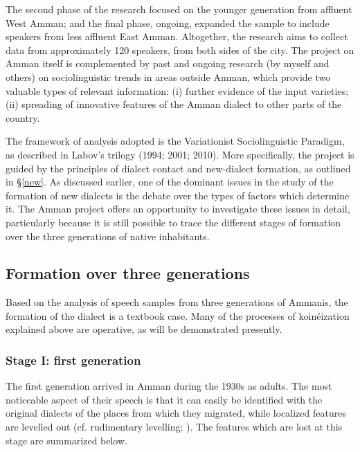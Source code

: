 \documentclass[output=paper]{langsci/langscibook}
\begin{document}
The second phase of the research focused on the younger generation from affluent West Amman; and the final phase, ongoing, expanded the sample to include speakers from less affluent East Amman. Altogether, the research aims to collect data from approximately 120 speakers, from both sides of the city. The project on Amman itself is complemented by past and ongoing research (by myself and others) on sociolinguistic trends in areas outside Amman, which provide two valuable types of relevant information: (i) further evidence of the input varieties; (ii) spreading of innovative features of the Amman dialect to other parts of the country.

The framework of analysis adopted is the Variationist Sociolinguistic Paradigm, as described in Labov’s trilogy (1994; 2001; 2010). More specifically, the project is guided by the principles of dialect contact and new-dialect formation, as outlined in §\ref{new}. As discussed earlier, one of the dominant issues in the study of the formation of new dialects is the debate over the types of factors which determine it. The Amman project offers an opportunity to investigate these issues in detail, particularly because it is still possible to trace the different stages of formation over the three generations of native inhabitants.

\subsection{Formation over three generations} \label{three}

Based on the analysis of speech samples from three generations of Ammanis, the formation of the dialect is a textbook case. Many of the processes of koinéization explained above are operative, as will be demonstrated presently.

\subsubsection{Stage I: first generation}

The first generation arrived in Amman during the 1930s as adults. The most noticeable aspect of their speech is that it can easily be identified with the original dialects of the places from which they migrated, while localized features are levelled out (cf. rudimentary levelling; \citealt{Trudgill2004}). The features which are lost at this stage are summarized below.
\end{document}
